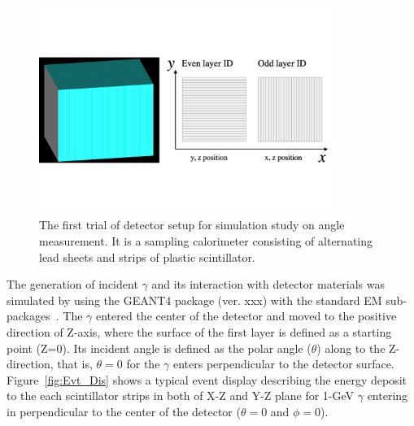 \documentclass[jkps,preprint,fleqn,showpacs,showkeys]{revtex4}
\newcommand{\XGB}{XGBoost}
\begin{document}
\begin{figure}[!hbt]
\includegraphics[width=0.85\textwidth]{figures/Sec2/Prototype_samplingcal.pdf}

\caption{ The first trial of detector setup for simulation study on angle measurement. It is a sampling calorimeter consisting of alternating lead sheets and strips of plastic scintillator. }
\label{fig:det_conf}
\end{figure}

The generation of incident $\gamma$ and its interaction with detector materials was simulated by using the GEANT4 package (ver. xxx) with the standard EM sub-packages~\cite{GEANT4}.
The $\gamma$ entered the center of the detector and moved to the positive direction of Z-axis, where the surface of the first layer is defined as a starting point (Z=0). Its incident angle is defined as the polar angle ($\theta$) along to the Z-direction, that is, $\theta = 0$ for the $\gamma$ enters perpendicular to the detector surface. %
Figure~\ref{fig:Evt_Dis} shows a typical event display describing the energy deposit to the each scintillator strips in both of X-Z and Y-Z plane for 1-GeV $\gamma$ entering in perpendicular to the center of the detector ($\theta=0$ and $\phi=0$). %
\end{document}
